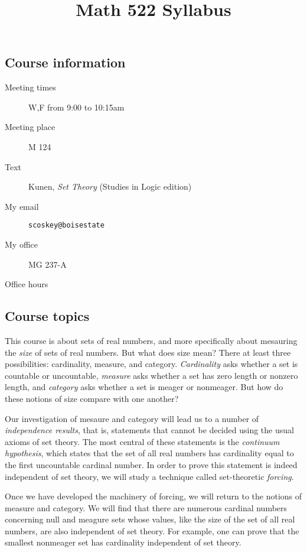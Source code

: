 \documentclass[12pt,oneside]{amsart}
\title{Math 522 Syllabus}
\begin{document}
\maketitle
\thispagestyle{empty}

\subsection*{Course information}
\begin{description}
\item[Meeting times] W,F from 9:00 to 10:15am
\item[Meeting place] M 124
\item[Text] Kunen, \emph{Set Theory} (Studies in Logic edition)
\item[My email] \texttt{scoskey@boisestate}
\item[My office] MG 237-A
\item[Office hours] \underline{\hspace{1in}}
\end{description}

\subsection*{Course topics}

This course is about sets of real numbers, and more specifically about mesauring the \emph{size} of sets of real numbers. But what does size mean? There at least three possibilities: cardinality, measure, and category. \emph{Cardinality} asks whether a set is countable or uncountable, \emph{measure} asks whether a set has zero length or nonzero length, and \emph{category} asks whether a set is meager or nonmeager. But how do these notions of size compare with one another?

Our investigation of mesaure and category will lead us to a number of \emph{independence results}, that is, statements that cannot be decided using the usual axioms of set theory. The most central of these statements is the \emph{continuum hypothesis}, which states that the set of all real numbers has cardinality equal to the first uncountable cardinal number. In order to prove this statement is indeed independent of set theory, we will study a technique called set-theoretic \emph{forcing}.

Once we have developed the machinery of forcing, we will return to the notions of measure and category. We will find that there are numerous cardinal numbers concerning null and meagure sets whose values, like the size of the set of all real numbers, are also independent of set theory. For example, one can prove that the smallest nonmeager set has cardinality independent of set theory.
\end{document}

